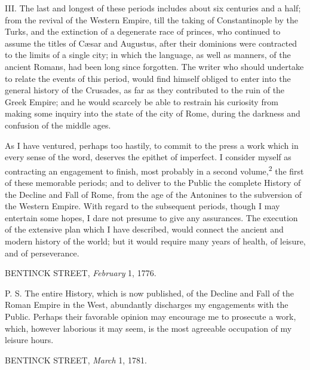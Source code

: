 III. The last and longest of these periods includes about six centuries and
a half; from the revival of the Western Empire, till the taking of Constantinople
by the Turks, and the extinction of a degenerate race of princes, who continued
to assume the titles of Cæsar and Augustus, after their dominions were contracted
to the limits of a single city; in which the language, as well as manners,
of the ancient Romans, had been long since forgotten. The writer who should
undertake to relate the events of this period, would find himself obliged to
enter into the general history of the Crusades, as far as they contributed to
the ruin of the Greek Empire; and he would scarcely be able to restrain his
curiosity from making some inquiry into the state of the city of Rome, during
the darkness and confusion of the middle ages.

As I have ventured, perhaps too hastily, to commit to the press a work which
in every sense of the word, deserves the epithet of imperfect. I consider
myself as contracting an engagement to finish, most probably in a second
volume,\textsuperscript{2} the first of these memorable periods; and to deliver
to the Public the complete History of the Decline and Fall of Rome, from the
age of the Antonines to the subversion of the Western Empire. With regard to
the subsequent periods, though I may entertain some hopes, I dare not presume
to give any assurances. The execution of the extensive plan which I have
described, would connect the ancient and modern history of the world; but it
would require many years of health, of leisure, and of perseverance.


BENTINCK STREET, \textit{February} 1, 1776.

P. S. The entire History, which is now published, of the Decline and Fall of
the Roman Empire in the West, abundantly discharges my engagements with the
Public. Perhaps their favorable opinion may encourage me to prosecute a work,
which, however laborious it may seem, is the most agreeable occupation of my
leisure hours.

BENTINCK STREET, \textit{March} 1, 1781.


